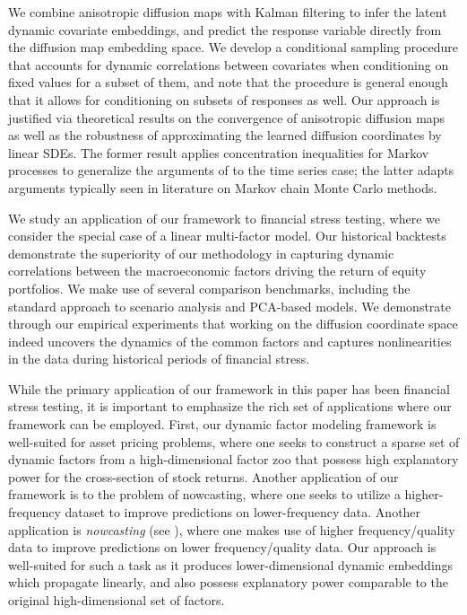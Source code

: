 \documentclass[11pt]{article}
\theoremstyle{plain}
\theoremstyle{definition}
\theoremstyle{remark}
\numberwithin{equation}{section}
\begin{document}
We combine anisotropic diffusion maps with Kalman filtering to infer the latent dynamic covariate embeddings, and predict the response variable directly from the diffusion map embedding space. We develop a conditional sampling procedure that accounts for dynamic correlations between covariates when conditioning on fixed values for a subset of them, and note that the procedure is general enough that it allows for conditioning on subsets of responses as well.
Our approach is justified via theoretical results on the convergence of anisotropic diffusion maps as well as the robustness of approximating the learned diffusion coordinates by linear SDEs. The former result applies concentration inequalities for Markov processes to generalize the arguments of \citet{singer_graph_2006,singer2008nonlinear} to the time series case; the latter adapts arguments typically seen in literature on Markov chain Monte Carlo methods.

We study an application of our framework to financial stress testing, where we consider the special case of a linear multi-factor model. Our historical backtests demonstrate the superiority of our methodology in capturing dynamic correlations between the macroeconomic factors driving the return of equity portfolios. We make use of several comparison benchmarks, including the standard approach to scenario analysis and PCA-based models. We demonstrate through our empirical experiments that working on the diffusion coordinate space indeed uncovers the dynamics of the common factors and captures nonlinearities in the data during historical periods of financial stress. 

While the primary application of our framework in this paper has been financial stress testing, it is important to emphasize the rich set of applications where our framework can be employed. 
First, our dynamic factor modeling framework is well-suited for asset pricing problems, where one seeks to construct a sparse set of dynamic factors from a high-dimensional factor zoo that possess high explanatory power for the cross-section of stock returns. Another application of our framework is to the problem of nowcasting, where one seeks to utilize a higher-frequency dataset to improve predictions on lower-frequency data. 
Another application is \emph{nowcasting} (see \citet{giannone_nowcasting_2008}), where one makes use of higher frequency/quality data to improve predictions on lower frequency/quality data. Our approach is well-suited for such a task as it produces lower-dimensional dynamic embeddings which propagate linearly, and also possess explanatory power comparable to the original high-dimensional set of factors. 
\end{document}
